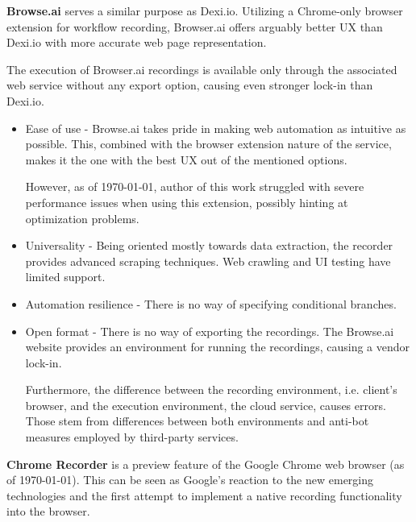 \textbf{Browse.ai} serves a similar purpose as Dexi.io.
Utilizing a Chrome-only browser extension for workflow recording, Browser.ai offers arguably better \ac{UX} than Dexi.io with more accurate web page representation.

The execution of Browser.ai recordings is available only through the associated web service without any export option, causing even stronger lock-in than Dexi.io.

\begin{itemize}
    \item Ease of use - Browse.ai takes pride in making web automation as intuitive as possible. 
    This, combined with the browser extension nature of the service, makes it the one with the best \ac{UX} out of the mentioned options.
    
    However, as of \today, author of this work struggled with severe performance issues when using this extension, possibly hinting at optimization problems.

    \item Universality - Being oriented mostly towards data extraction, the recorder provides advanced scraping techniques.
    Web crawling and \ac{UI} testing have limited support.

    \item Automation resilience -
    There is no way of specifying conditional branches. 
    
    \item Open format - There is no way of exporting the recordings. 
    The Browse.ai website provides an environment for running the recordings, causing a vendor lock-in. 
    
    Furthermore, the difference between the recording environment, i.e. client's browser, and the execution environment, the cloud service, causes errors. 
    Those stem from differences between both environments and anti-bot measures employed by third-party services.
\end{itemize}

\textbf{Chrome Recorder} is a preview feature of the Google Chrome web browser (as of \today).
This can be seen as Google's reaction to the new emerging technologies and the first attempt to implement a native recording functionality into the browser.

